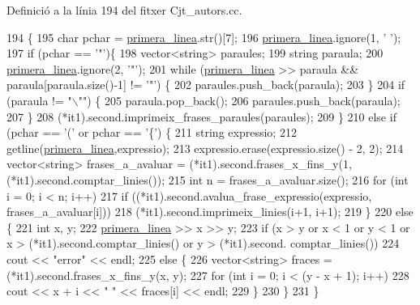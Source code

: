 Definició a la línia 194 del fitxer Cjt\+\_\+autors.\+cc.


\begin{DoxyCode}
194                         \{
195     \textcolor{keywordtype}{char} pchar = \hyperlink{class_cjt__autors_a833753dc5eaa466591f7dce971e5021c}{primera\_linea}.str()[7];
196     \hyperlink{class_cjt__autors_a833753dc5eaa466591f7dce971e5021c}{primera\_linea}.ignore(1, \textcolor{charliteral}{' '});
197     \textcolor{keywordflow}{if} (pchar == \textcolor{charliteral}{'"'})\{
198         vector<string> paraules;
199         \textcolor{keywordtype}{string} paraula;
200         \hyperlink{class_cjt__autors_a833753dc5eaa466591f7dce971e5021c}{primera\_linea}.ignore(2, \textcolor{charliteral}{'"'});
201         \textcolor{keywordflow}{while} (\hyperlink{class_cjt__autors_a833753dc5eaa466591f7dce971e5021c}{primera\_linea} >> paraula && paraula[paraula.size()-1] != \textcolor{charliteral}{'"'}) \{
202             paraules.push\_back(paraula);
203         \}
204         \textcolor{keywordflow}{if} (paraula != \textcolor{stringliteral}{"\(\backslash\)""}) \{
205             paraula.pop\_back();
206             paraules.push\_back(paraula);
207         \}
208         (*it1).second.imprimeix\_frases\_paraules(paraules);
209     \}
210     \textcolor{keywordflow}{else} \textcolor{keywordflow}{if} (pchar == \textcolor{charliteral}{'('} or pchar == \textcolor{charliteral}{'\{'}) \{
211         \textcolor{keywordtype}{string} expressio;
212         getline(\hyperlink{class_cjt__autors_a833753dc5eaa466591f7dce971e5021c}{primera\_linea},expressio);
213         expressio.erase(expressio.size() - 2, 2);
214         vector<string> frases\_a\_avaluar = (*it1).second.frases\_x\_fins\_y(1, (*it1).second.comptar\_linies());
215         \textcolor{keywordtype}{int} n = frases\_a\_avaluar.size();
216         \textcolor{keywordflow}{for} (\textcolor{keywordtype}{int} i = 0; i < n; i++)
217             \textcolor{keywordflow}{if} ((*it1).second.avalua\_frase\_expressio(expressio, frases\_a\_avaluar[i]))
218                 (*it1).second.imprimeix\_linies(i+1, i+1);
219     \}
220     \textcolor{keywordflow}{else} \{
221         \textcolor{keywordtype}{int} x, y;
222         \hyperlink{class_cjt__autors_a833753dc5eaa466591f7dce971e5021c}{primera\_linea} >> x >> y;
223         \textcolor{keywordflow}{if} (x > y or x < 1 or y < 1 or x > (*it1).second.comptar\_linies() or y > (*it1).second.
      comptar\_linies())
224             cout << \textcolor{stringliteral}{"error"} << endl;
225         \textcolor{keywordflow}{else} \{
226             vector<string> fraces = (*it1).second.frases\_x\_fins\_y(x, y);
227             \textcolor{keywordflow}{for} (\textcolor{keywordtype}{int} i = 0; i < (y - x + 1); i++)
228                 cout << x + i << \textcolor{stringliteral}{" "} << fraces[i] << endl;
229         \}
230     \}
231 \}
\end{DoxyCode}
